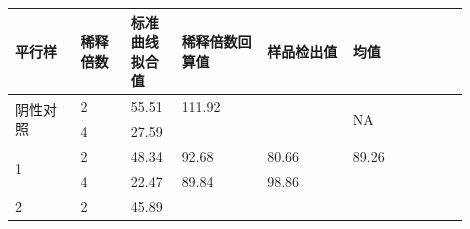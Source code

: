\documentclass[UTF8,10pt,a4paper,fontset=fandol]{ctexart}
\newcommand{\fieldvalue}[1]{#1}
\newcommand{\handwritten}[1]{#1}
\begin{document}
\small
\begin{tabular}{|p{0.13\linewidth}|p{0.10\linewidth}|p{0.10\linewidth}|p{0.17\linewidth}|p{0.17\linewidth}|p{0.15\linewidth}|p{0.08\linewidth}|}
\hline
平行样 & 稀释倍数 & 标准曲线拟合值 & 稀释倍数回算值 & 样品检出值 & 均值 & \\
\hline
\multirow{2}{*}{阴性对照}
&
\fieldvalue{\handwritten{2}}
&
\fieldvalue{\handwritten{55.51}}
&
\fieldvalue{\handwritten{111.92}}
& & \multirow{2}{*}{NA} & \\
\cline{2-5}
&
\fieldvalue{\handwritten{4}}
&
\fieldvalue{\handwritten{27.59}}
& & & & \\
\hline
\multirow{2}{*}{1}
&
\fieldvalue{\handwritten{2}}
&
\fieldvalue{\handwritten{48.34}}
&
\fieldvalue{\handwritten{92.68}}
&
\fieldvalue{\handwritten{80.66}}
&
\fieldvalue{\handwritten{89.26}}
& \\
\cline{2-6}
&
\fieldvalue{\handwritten{4}}
&
\fieldvalue{\handwritten{22.47}}
&
\fieldvalue{\handwritten{89.84}}
&
\fieldvalue{\handwritten{98.86}}
& & \\
\hline
\multirow{2}{*}{2}
&
\fieldvalue{\handwritten{2}}
&
\fieldvalue{\handwritten{45.89}}

\end{tabular}
\end{document}
